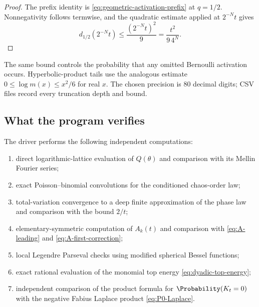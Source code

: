 \documentclass[11pt,oneside]{article}
\theoremstyle{definition}
\theoremstyle{remark}
\begin{document}
\begin{proof}
The prefix identity is \eqref{eq:geometric-activation-prefix} at $q=1/2$.
Nonnegativity follows termwise, and the quadratic estimate applied at
$2^{-N}t$ gives
\[
 d_{1/2}(2^{-N}t)\le\frac{(2^{-N}t)^2}{9}
 =\frac{t^2}{9\,4^N}.
\]
\end{proof}

The same bound controls the probability that any omitted Bernoulli activation
occurs.  Hyperbolic-product tails use the analogous estimate
$0\le\log m(x)\le x^2/6$ for real $x$.  The chosen precision is 80 decimal
digits; CSV files record every truncation depth and bound.

\subsection{What the program verifies}

The driver performs the following independent computations:
\begin{enumerate}
\item direct logarithmic-lattice evaluation of $Q(\theta)$ and comparison with
      its Mellin Fourier series;
\item exact Poisson--binomial convolutions for the conditioned chaos-order law;
\item total-variation convergence to a deep finite approximation of the phase
      law and comparison with the bound $2/t$;
\item elementary-symmetric computation of $A_k(t)$ and comparison with
      \eqref{eq:A-leading} and \eqref{eq:A-first-correction};
\item local Legendre Parseval checks using modified spherical Bessel functions;
\item exact rational evaluation of the monomial top energy
      \eqref{eq:dyadic-top-energy};
\item independent comparison of the product formula for $\Probability(K_t=0)$ with
      the negative Fabius Laplace product \eqref{eq:P0-Laplace}.
\end{enumerate}
\end{document}
